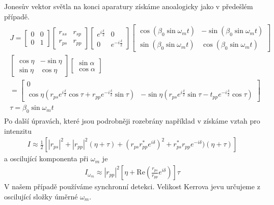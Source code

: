 Jonesův vektor světla na konci aparatury získáme anoalogicky jako v předešlém případě.
\begin{eqnarray}
\begin{split}
J=\begin{bmatrix}0&0\\0&1\end{bmatrix}
\begin{bmatrix}r_{ss}&r_{sp}\\r_{ps}& r_{pp}\end{bmatrix}
\begin{bmatrix}e^{i\frac{\delta}{2}}&0\\0&e^{-i\frac{\delta}{2}}\end{bmatrix}
\begin{bmatrix}\cos(\beta_0\sin\omega_mt) & -\sin(\beta_0\sin\omega_mt) \\ \sin(\beta_0\sin\omega_mt)&\cos(\beta_0\sin\omega_mt)\end{bmatrix} \\
\begin{bmatrix}\cos\eta&-\sin\eta\\\sin\eta&\cos\eta\end{bmatrix}
\begin{bmatrix}\sin\alpha\\\cos\alpha\end{bmatrix} \\
=\begin{bmatrix}0\\\cos\eta(r_{ps}e^{i\frac{\delta}{2}}\cos\tau+r_{pp}e^{-i\frac{\delta}{2}}\sin\tau)& -\sin\eta(r_{ps}e^{i\frac{\delta}{2}}\sin\tau-t_{pp}e^{-i\frac{\delta}{2}}\cos\tau)\end{bmatrix}\\
\tau = \beta_0\sin\omega_mt
\end{split}
\end{eqnarray}
Po další úpravách, které jsou podrobněji rozebrány například v \cite{Nyvlt} získáme vztah pro intenzitu
\begin{eqnarray}
I\approx\frac{1}{2}\left[|r_{ps}|^2+|r_{pp}|^2(\eta+\tau)+(r_{ps}r^*_{pp}e^{i\delta})^2+r^*_{ps}r_{pp}e^{-i\delta})(\eta+\tau)\right]
\end{eqnarray}
a oscilující komponenta při $\omega_m$ je
\begin{eqnarray}
I_{\omega_m}\approx|r_{pp}|^2\left[\eta+\mbox{Re}\left(\frac{r_{ps}}{r_{pp}}e^{i\delta}\right)\right]\tau
\end{eqnarray}
V našem případě používáme synchronní detekci. Velikost Kerrova jevu určujeme z oscilující složky úměrné $\omega_m$.

